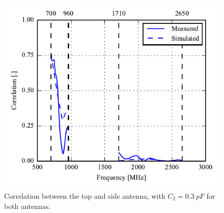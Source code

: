 \begin{figure}[htbp]
    \centering
    \includegraphics{img/tech_sol/monopole/prototype_v2/meas_sim_corr}
    \caption{Correlation between the top and side antenna, with $C_2=\SI{0.3}{pF}$ for both antennas.}
    \label{fig:ant1_proto_corr}
\end{figure}
